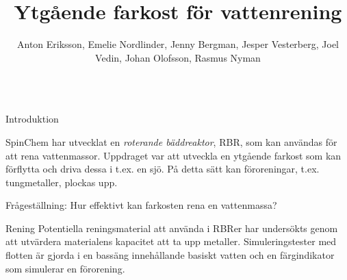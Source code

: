\documentclass[final]{beamer}
\title{Ytgående farkost för vattenrening}
\author{Anton Eriksson, Emelie Nordlinder, Jenny Bergman,
  Jesper Vesterberg, Joel Vedin, Johan Olofsson, Rasmus Nyman}
\institute{Design-Build-Test Grupp 5, Umeå Universitet}
\newlength{\onecolwid}
\begin{document}

\setlength{\belowcaptionskip}{2ex} %
\setlength\belowdisplayshortskip{2ex} %

\begin{frame}[t]

  \begin{columns}[c]
    \begin{column}{\textwidth}
      \centering
      \vskip 1cm
      \vskip 2cm
    \end{column}
  \end{columns}

  \vspace{2cm}

  \begin{columns}[t, totalwidth=0.99\textwidth]

    \begin{column}{\onecolwid}

      \begin{block}{Introduktion}

        SpinChem har utvecklat en \emph{roterande bäddreaktor}, RBR,
        som kan användas för att rena vattenmassor.
        Uppdraget var att utveckla
        en ytgående farkost som kan förflytta och driva dessa i t.ex. en sjö.
        På detta sätt kan föroreningar, t.ex. tungmetaller, plockas upp.

        Frågeställning: Hur effektivt kan farkosten rena en vattenmassa?

      \end{block}

      \begin{block}{Rening}
        Potentiella reningsmaterial att använda i RBRer har undersökts genom att
        utvärdera materialens kapacitet att ta upp metaller. Simuleringstester
        med flotten är gjorda i en bassäng innehållande basiskt vatten och en
        färgindikator som simulerar en förorening.


\end{block}
\end{column}
\end{columns}
\end{frame}
\end{document}
